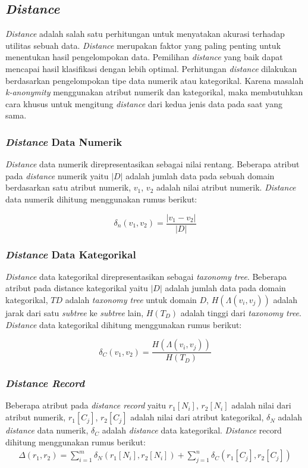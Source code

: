 \subsection{\textit{Distance}} 
\textit{Distance} adalah salah satu perhitungan untuk menyatakan akurasi terhadap utilitas sebuah data. \textit{Distance} merupakan faktor yang paling penting untuk menentukan hasil pengelompokan data. Pemilihan \textit{distance} yang baik dapat mencapai hasil klasifikasi dengan lebih optimal. Perhitungan \textit{distance} dilakukan berdasarkan pengelompokan tipe data numerik atau kategorikal. Karena masalah \textit{k-anonymity} menggunakan atribut numerik dan kategorikal, maka membutuhkan cara khusus untuk mengitung \textit{distance} dari kedua jenis data pada saat yang sama. 

\subsubsection{\textit{Distance} Data Numerik}
\textit{Distance} data numerik direpresentasikan sebagai nilai rentang. Beberapa atribut pada \textit{distance} numerik yaitu $|D|$ adalah jumlah data pada sebuah domain berdasarkan satu atribut numerik, $v_1$, $v_2$ adalah nilai atribut numerik. \textit{Distance} data numerik dihitung menggunakan rumus berikut:

\begin{equation}
\delta_n(v_1,v_2) = \frac{|v_1 - v_2|}{|D|} 
\end{equation}

\subsubsection{\textit{Distance} Data Kategorikal}
\textit{Distance} data kategorikal direpresentasikan sebagai \textit{taxonomy tree}. Beberapa atribut pada distance kategorikal yaitu $|D|$ adalah jumlah data pada domain kategorikal, $TD$ adalah \textit{taxonomy tree} untuk domain $D$, $H(\Lambda(v_i,v_j))$ adalah jarak dari satu \textit{subtree} ke \textit{subtree} lain, $H(T_D)$ adalah tinggi dari \textit{taxonomy tree}. \textit{Distance} data kategorikal dihitung menggunakan rumus berikut:

\begin{equation}
\delta_C(v_1,v_2) = \frac{H(\Lambda(v_i,v_j))}{H(T_D)} 
\end{equation}

\subsubsection{\textit{Distance Record}}
Beberapa atribut pada \textit{distance record} yaitu $r_1[N_i]$, $r_2[N_i]$ adalah nilai dari atribut numerik, $r_1[C_j]$, $r_2[C_j]$ adalah nilai dari atribut kategorikal, $\delta_N$ adalah \textit{distance} data numerik, $\delta_C$ adalah \textit{distance} data kategorikal. \textit{Distance} record dihitung menggunakan rumus berikut:
\begin{align}
\Delta (r_1,r_2) = \sum_{i=1}^{m} \delta_N(r_1[N_i],r_2	[N_i]) +  \sum_{j=1}^{n} \delta_C(r_1[C_j],r_2[C_j])
\end{align}


